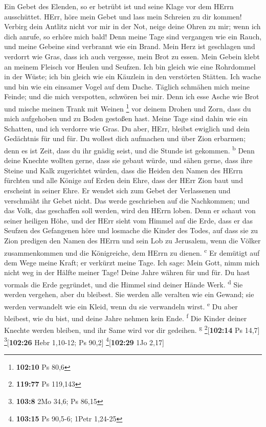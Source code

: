  Ein Gebet des Elenden, so er betrübt ist und seine Klage
vor dem HErrn ausschüttet.  HErr, höre mein Gebet und lass
mein Schreien zu dir kommen!  Verbirg dein Antlitz nicht
vor mir in der Not, neige deine Ohren zu mir; wenn ich dich anrufe, so
erhöre mich bald!  Denn meine Tage sind vergangen wie ein
Rauch, und meine Gebeine sind verbrannt wie ein Brand. 
Mein Herz ist geschlagen und verdorrt wie Gras, dass ich auch vergesse,
mein Brot zu essen.  Mein Gebein klebt an meinem Fleisch
vor Heulen und Seufzen.  Ich bin gleich wie eine
Rohrdommel in der Wüste; ich bin gleich wie ein Käuzlein in den
verstörten Stätten.  Ich wache und bin wie ein einsamer
Vogel auf dem Dache.  Täglich schmähen mich meine Feinde;
und die mich verspotten, schwören bei mir.  Denn ich esse
Asche wie Brot und mische meinen Trank mit Weinen \footnote{\textbf{102:10}
  Ps 80,6}  vor deinem Drohen und Zorn, dass du mich
aufgehoben und zu Boden gestoßen hast.  Meine Tage sind
dahin wie ein Schatten, und ich verdorre wie Gras.  Du
aber, HErr, bleibst ewiglich und dein Gedächtnis für und für.
 Du wollest dich aufmachen und über Zion erbarmen; denn
es ist Zeit, dass du ihr gnädig seist, und die Stunde ist gekommen.
\textsuperscript{b}  Denn deine Knechte wollten gerne,
dass sie gebaut würde, und sähen gerne, dass ihre Steine und Kalk
zugerichtet würden,  dass die Heiden den Namen des HErrn
fürchten und alle Könige auf Erden dein Ehre,  dass der
HErr Zion baut und erscheint in seiner Ehre.  Er wendet
sich zum Gebet der Verlassenen und verschmäht ihr Gebet nicht.
 Das werde geschrieben auf die Nachkommen; und das Volk,
das geschaffen soll werden, wird den HErrn loben.  Denn
er schaut von seiner heiligen Höhe, und der HErr sieht vom Himmel auf
die Erde,  dass er das Seufzen des Gefangenen höre und
losmache die Kinder des Todes,  auf dass sie zu Zion
predigen den Namen des HErrn und sein Lob zu Jerusalem, 
wenn die Völker zusammenkommen und die Königreiche, dem HErrn zu dienen.
\textsuperscript{c}  Er demütigt auf dem Wege meine
Kraft; er verkürzt meine Tage.  Ich sage: Mein Gott, nimm
mich nicht weg in der Hälfte meiner Tage! Deine Jahre währen für und
für.  Du hast vormals die Erde gegründet, und die Himmel
sind deiner Hände Werk. \textsuperscript{d}  Sie werden
vergehen, aber du bleibest. Sie werden alle veralten wie ein Gewand; sie
werden verwandelt wie ein Kleid, wenn du sie verwandeln wirst.
\textsuperscript{e}  Du aber bleibest, wie du bist, und
deine Jahre nehmen kein Ende. \textsuperscript{f}  Die
Kinder deiner Knechte werden bleiben, und ihr Same wird vor dir
gedeihen. \textsuperscript{g} \footnote{\textbf{119:77} Ps 119,143}{[}\textbf{102:14}
Ps 14,7{]} \footnote{\textbf{103:8} 2Mo 34,6; Ps 86,15}{[}\textbf{102:26}
Hebr 1,10-12; Ps 90,2{]} \footnote{\textbf{103:15} Ps 90,5-6; 1Petr
  1,24-25}{[}\textbf{102:29} 1Jo 2,17{]}

